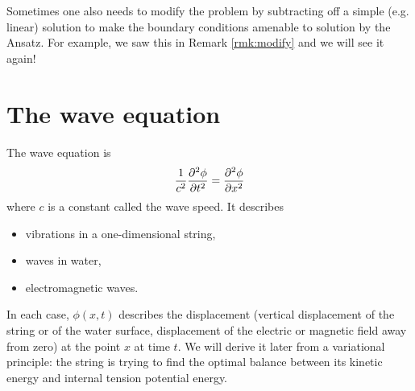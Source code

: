Sometimes one also needs to modify the problem by subtracting off a simple (e.g. linear) solution to make the boundary conditions amenable to solution by the Ansatz. For example, we saw this in Remark \ref{rmk:modify} and we will see it again! 

\section{The wave equation}

The wave equation is
\[\frac{1}{c^2}\frac{\partial^2 \phi}{\partial t ^2}=\frac{\partial^2 \phi}{\partial x ^2}\]
where $c$ is a constant called the wave speed. It describes
\begin{itemize}
\item vibrations in a one-dimensional string,
\item waves in water,
\item electromagnetic waves.
\end{itemize}
In each case, $\phi(x,t)$ describes the displacement (vertical displacement of the string or of the water surface, displacement of the electric or magnetic field away from zero) at the point $x$ at time $t$. We will derive it later from a variational principle: the string is trying to find the optimal balance between its kinetic energy and internal tension potential energy.

